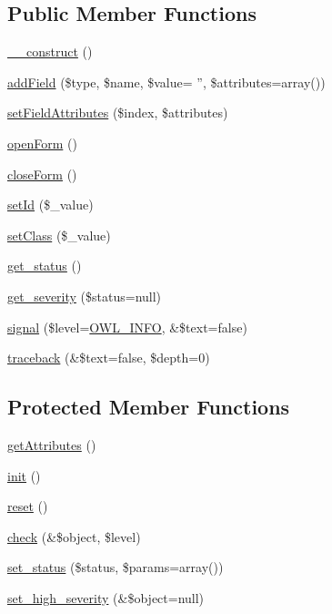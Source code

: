 \subsection*{Public Member Functions}
\begin{DoxyCompactItemize}
\item 
\hyperlink{classFormElement_af5ecddb99f71fcd2a7b52b2dbcd4c4c5}{\_\-\_\-construct} ()
\item 
\hyperlink{classFormElement_a805d7d62c7f794c0414a7a07d3a97112}{addField} (\$type, \$name, \$value= '', \$attributes=array())
\item 
\hyperlink{classFormElement_a50628436474976735e6452ef2439bc31}{setFieldAttributes} (\$index, \$attributes)
\item 
\hyperlink{classFormElement_a75fc391aab857b0357576d9fe353ab27}{openForm} ()
\item 
\hyperlink{classFormElement_a14feba74af80db37e927d740d4b82a76}{closeForm} ()
\item 
\hyperlink{classDOMElement_afb849b6d94ad4911d255e7ede4ee0d83}{setId} (\$\_\-value)
\item 
\hyperlink{classDOMElement_a593e89f31f6c1050d3948b29b00f387a}{setClass} (\$\_\-value)
\item 
\hyperlink{class__OWL_a99ec771fa2c5c279f80152cc09e489a8}{get\_\-status} ()
\item 
\hyperlink{class__OWL_adf9509ef96858be7bdd9414c5ef129aa}{get\_\-severity} (\$status=null)
\item 
\hyperlink{class__OWL_a51ba4a16409acf2a2f61f286939091a5}{signal} (\$level=\hyperlink{owl_8severitycodes_8php_a139328861128689f2f4def6a399d9057}{OWL\_\-INFO}, \&\$text=false)
\item 
\hyperlink{class__OWL_aa29547995d6741b7d2b90c1d4ea99a13}{traceback} (\&\$text=false, \$depth=0)
\end{DoxyCompactItemize}
\subsection*{Protected Member Functions}
\begin{DoxyCompactItemize}
\item 
\hyperlink{classDOMElement_a6c303bd7b18fdf485d05554b2f2191d9}{getAttributes} ()
\item 
\hyperlink{class__OWL_ae0ef3ded56e8a6b34b6461e5a721cd3e}{init} ()
\item 
\hyperlink{class__OWL_a2f2a042bcf31965194c03033df0edc9b}{reset} ()
\item 
\hyperlink{class__OWL_ad6f4f6946f40199dd0333cf219fa500e}{check} (\&\$object, \$level)
\item 
\hyperlink{class__OWL_aea912d0ede9b3c2a69b79072d94d4787}{set\_\-status} (\$status, \$params=array())
\item 
\hyperlink{class__OWL_a576829692a3b66e3d518853bf43abae3}{set\_\-high\_\-severity} (\&\$object=null)
\end{DoxyCompactItemize}
